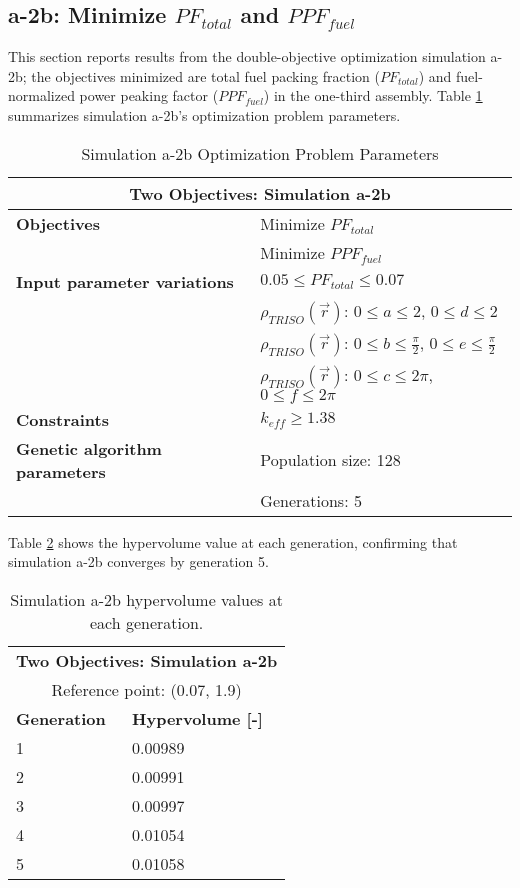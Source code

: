\subsection{a-2b: Minimize $PF_{total}$ and $PPF_{fuel}$}
\label{sec:a-2b}
This section reports results from the double-objective optimization simulation a-2b; the 
objectives minimized are total fuel packing fraction ($PF_{total}$) and fuel-normalized 
power peaking factor ($PPF_{fuel}$) in the one-third assembly.  
Table \ref{tab:simulationa2b} summarizes simulation a-2b's optimization problem parameters. 
\begin{table}[htbp!]
    \centering
    \onehalfspacing
    \caption{Simulation a-2b Optimization Problem Parameters}
	\label{tab:simulationa2b}
    \footnotesize
    \begin{tabular}{l|p{5.3cm}}
    \hline 
    \multicolumn{2}{c}{\textbf{Two Objectives: Simulation a-2b}} \\
    \hline 
    \textbf{Objectives} & Minimize $PF_{total}$ \\
    & Minimize $PPF_{fuel}$ \\
    \hline 
    \textbf{Input parameter variations} & $0.05 \leq PF_{total} \leq 0.07$ \\
    & $\rho_{TRISO}(\vec{r})$: $0 \leq a \leq 2$, $0 \leq d \leq 2$\\
    & $\rho_{TRISO}(\vec{r})$: $0 \leq b \leq \frac{\pi}{2}$, $0 \leq e \leq \frac{\pi}{2}$\\
    & $\rho_{TRISO}(\vec{r})$: $0 \leq c \leq 2\pi$, $0 \leq f \leq 2\pi$\\
    \hline
    \textbf{Constraints} & $k_{eff} \geq 1.38$\\ 
    \hline 
    \textbf{Genetic algorithm parameters} & Population size: 128 \\
    & Generations: 5 \\
    \hline
    \end{tabular}
\end{table}
Table \ref{tab:a2b-hypervolume} shows the hypervolume value at each generation, 
confirming that simulation a-2b converges by generation 5. 
\begin{table}[htbp!]
    \centering
    \onehalfspacing
    \caption{Simulation a-2b hypervolume values at each generation.}
	\label{tab:a2b-hypervolume}
    \footnotesize
    \begin{tabular}{ll}
    \hline 
    \multicolumn{2}{c}{\textbf{Two Objectives: Simulation a-2b}} \\
    \multicolumn{2}{c}{Reference point: (0.07, 1.9)} \\
    \hline 
    \textbf{Generation} & \textbf{Hypervolume [-]} \\
    \hline
    1 & 0.00989 \\
    2 & 0.00991 \\
    3 & 0.00997 \\
    4 & 0.01054\\
    5 & 0.01058\\
    \hline
    \end{tabular}
\end{table}

